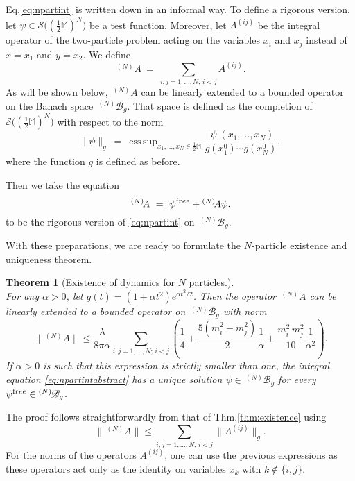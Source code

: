 \documentclass[b5paper,draft,openbib,12pt]{memoir}
\newtheorem{Thm}[Def]{Theorem}
\newcommand{\M}{\mathbb{M}}
\newcommand{\free}{{\textup free}}
\newcommand{\Banach}{\mathscr{B}}
\DeclareMathOperator*{\esssup}{ess \, sup}
\begin{document}
Eq.\@ \eqref{eq:npartint} is written down in an 
informal way. To define a rigorous version, let 
$\psi \in \mathcal{S}\big( (\tfrac{1}{2}\M)^N\big)$ 
be a test function. Moreover, let $A^{(ij)}$ be the 
integral operator of the two-particle problem acting 
on the variables $x_i$ and $x_j$ instead of $x = x_1$ 
and $y=x_2$. We define
\begin{equation}
	\,^{(N)}\! A ~=~ \sum_{i,j =1,...,N; \, i<j} A^{(ij)}.
\end{equation}
As will be shown below, $\! \,^{(N)}\! A$ can be 
linearly extended to a bounded operator on the Banach 
space $\! \,^{(N)}\!\Banach_g$. That space is defined 
as the completion of $\mathcal{S}\big( 
  (\tfrac{1}{2}\M)^N\big)$ with respect to the norm
\begin{equation}
	\|\psi \|_g ~=~ \esssup_{x_1,...,x_N \in \frac{1}{2}\M} \frac{|\psi|(x_1,...,x_N)}{g(x_1^0)\cdots g(x_N^0)},
\end{equation}
where the function $g$ is defined as before.

Then we take the equation
\begin{equation}
	\,^{(N)}\! A ~=~\psi^\free + \! \,^{(N)}\! A \psi.
\label{eq:npartintabstract}
\end{equation}
to be the rigorous version of \eqref{eq:npartint} on 
$\! \,^{(N)}\!\Banach_g$.

With these preparations, we are ready to formulate 
the $N$-particle existence and uniqueness theorem.

\begin{Thm}[Existence of dynamics for $N$ particles.]
	\label{thm:Npart}~\\
		For any $\alpha > 0$, let $g(t) = (1+\alpha t^2)e^{\alpha t^2/2}$. Then the operator $\! \,^{(N)}\! A$ can be linearly extended to a bounded operator on $\! \,^{(N)}\!\Banach_g$ with norm
	\begin{equation}
    \|\! \,^{(N)}\! A\| \leq\frac{\lambda}{8\pi \alpha}\! \sum_{i,j =1,...,N; \, i<j} \! 
    \left( \frac{1}{4} \!+\! \frac{5(m_i^2 + m_j^2)}{2} \frac{1}{\alpha} 
    \!+ \!\frac{m_i^2 \, m_j^2}{10} \frac{1}{\alpha^2} \right).
	\end{equation}
  If $\alpha > 0$ is such that this expression is 
  strictly smaller than one, the integral equation 
  \eqref{eq:npartintabstract} has a unique solution 
  $\psi \in \! \,^{(N)}\!\Banach_g$ for every 
  $\psi^\free \in \! \,^{(N)}\!\Banach_g$.
\end{Thm}

The proof follows straightforwardly from that of 
Thm.\@ \ref{thm:existence} using
\begin{equation}
	\|\! \,^{(N)}\! A\| \leq \sum_{i,j =1,...,N; \, i<j} \| A^{(ij)}\|_g.
\end{equation}
For the norms of the operators $A^{(ij)}$, one can 
use the previous expressions as these operators act 
only as the identity on variables $x_k$ with 
$k \notin \{i,j\}$.
\end{document}
